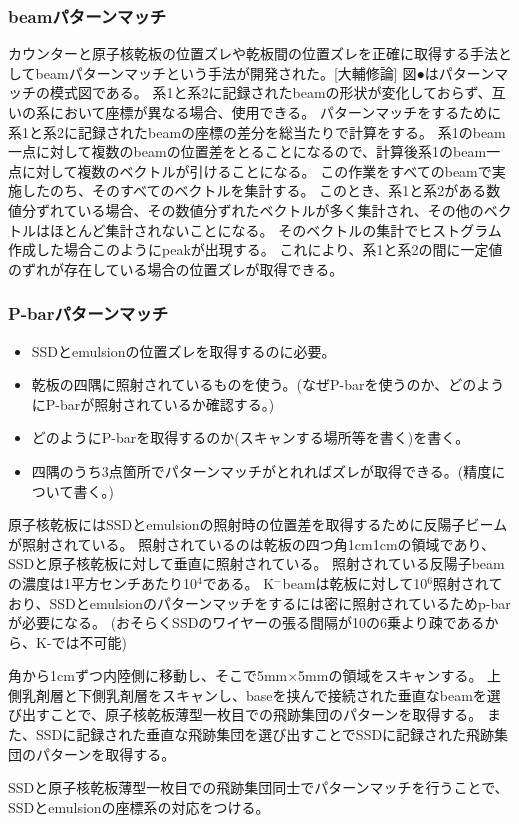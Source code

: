 \documentclass[12pt,a4paper]{jarticle}
\begin{document}
\subsubsection{beamパターンマッチ}
カウンターと原子核乾板の位置ズレや乾板間の位置ズレを正確に取得する手法としてbeamパターンマッチという手法が開発された。[大輔修論]
図●はパターンマッチの模式図である。
系1と系2に記録されたbeamの形状が変化しておらず、互いの系において座標が異なる場合、使用できる。
パターンマッチをするために系1と系2に記録されたbeamの座標の差分を総当たりで計算をする。
系1のbeam一点に対して複数のbeamの位置差をとることになるので、計算後系1のbeam一点に対して複数のベクトルが引けることになる。
この作業をすべてのbeamで実施したのち、そのすべてのベクトルを集計する。
このとき、系1と系2がある数値分ずれている場合、その数値分ずれたベクトルが多く集計され、その他のベクトルはほとんど集計されないことになる。
そのベクトルの集計でヒストグラム作成した場合このようにpeakが出現する。
これにより、系1と系2の間に一定値のずれが存在している場合の位置ズレが取得できる。
\subsubsection{P-barパターンマッチ}
\begin{itemize}
    \item SSDとemulsionの位置ズレを取得するのに必要。
    \item 乾板の四隅に照射されているものを使う。(なぜP-barを使うのか、どのようにP-barが照射されているか確認する。)
    \item どのようにP-barを取得するのか(スキャンする場所等を書く)を書く。
    \item 四隅のうち3点箇所でパターンマッチがとれればズレが取得できる。(精度について書く。)
\end{itemize}
原子核乾板にはSSDとemulsionの照射時の位置差を取得するために反陽子ビームが照射されている。
照射されているのは乾板の四つ角1cm1cmの領域であり、SSDと原子核乾板に対して垂直に照射されている。
照射されている反陽子beamの濃度は1平方センチあたり10$^4$である。
K$^-$beamは乾板に対して10$^6$照射されており、SSDとemulsionのパターンマッチをするには密に照射されているためp-barが必要になる。
(おそらくSSDのワイヤーの張る間隔が10の6乗より疎であるから、K-では不可能)
\par
角から1cmずつ内陸側に移動し、そこで5mm×5mmの領域をスキャンする。
上側乳剤層と下側乳剤層をスキャンし、baseを挟んで接続された垂直なbeamを選び出すことで、原子核乾板薄型一枚目での飛跡集団のパターンを取得する。
また、SSDに記録された垂直な飛跡集団を選び出すことでSSDに記録された飛跡集団のパターンを取得する。
\par
SSDと原子核乾板薄型一枚目での飛跡集団同士でパターンマッチを行うことで、SSDとemulsionの座標系の対応をつける。
\end{document}
